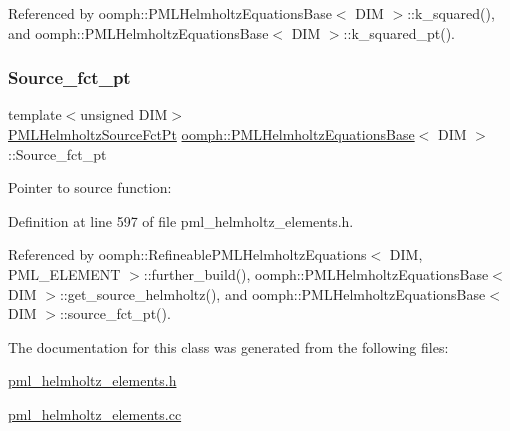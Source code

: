 Referenced by oomph\+::\+P\+M\+L\+Helmholtz\+Equations\+Base$<$ D\+I\+M $>$\+::k\+\_\+squared(), and oomph\+::\+P\+M\+L\+Helmholtz\+Equations\+Base$<$ D\+I\+M $>$\+::k\+\_\+squared\+\_\+pt().

\mbox{\label{classoomph_1_1PMLHelmholtzEquationsBase_aba2080d52978ab390f035f0ee858c0d6}} 
\subsubsection{\texorpdfstring{Source\+\_\+fct\+\_\+pt}{Source\_fct\_pt}}
{\footnotesize\ttfamily template$<$unsigned D\+IM$>$ \\
\hyperlink{classoomph_1_1PMLHelmholtzEquationsBase_abf57477abc2672cd680742e17721a07f}{P\+M\+L\+Helmholtz\+Source\+Fct\+Pt} \hyperlink{classoomph_1_1PMLHelmholtzEquationsBase}{oomph\+::\+P\+M\+L\+Helmholtz\+Equations\+Base}$<$ D\+IM $>$\+::Source\+\_\+fct\+\_\+pt\hspace{0.3cm}{\ttfamily [protected]}}



Pointer to source function\+: 



Definition at line 597 of file pml\+\_\+helmholtz\+\_\+elements.\+h.



Referenced by oomph\+::\+Refineable\+P\+M\+L\+Helmholtz\+Equations$<$ D\+I\+M, P\+M\+L\+\_\+\+E\+L\+E\+M\+E\+N\+T $>$\+::further\+\_\+build(), oomph\+::\+P\+M\+L\+Helmholtz\+Equations\+Base$<$ D\+I\+M $>$\+::get\+\_\+source\+\_\+helmholtz(), and oomph\+::\+P\+M\+L\+Helmholtz\+Equations\+Base$<$ D\+I\+M $>$\+::source\+\_\+fct\+\_\+pt().



The documentation for this class was generated from the following files\+:\begin{DoxyCompactItemize}
\item 
\hyperlink{pml__helmholtz__elements_8h}{pml\+\_\+helmholtz\+\_\+elements.\+h}\item 
\hyperlink{pml__helmholtz__elements_8cc}{pml\+\_\+helmholtz\+\_\+elements.\+cc}\end{DoxyCompactItemize}
